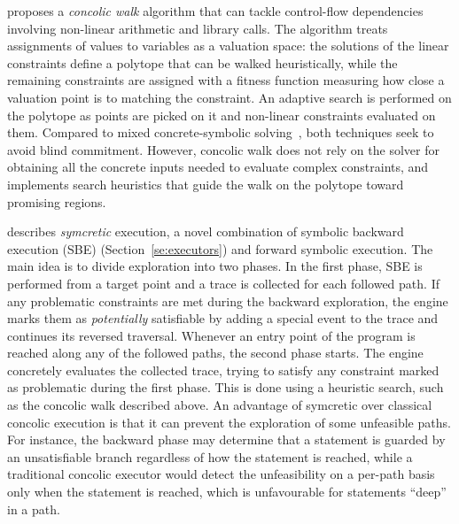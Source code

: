 \cite{DA-FSE14} proposes a {\em concolic walk} algorithm that can tackle control-flow dependencies involving non-linear arithmetic and library calls. The algorithm treats assignments of values to variables as a valuation space: the solutions of the linear constraints define a polytope that can be walked heuristically, while the remaining constraints are assigned with a fitness function measuring how close a valuation point is to matching the constraint. An adaptive search is performed on the polytope as points are picked on it and non-linear constraints evaluated on them. Compared to mixed concrete-symbolic solving~\cite{PRV-ISSTA11}, both techniques seek to avoid blind commitment. However, concolic walk does not rely on the solver for obtaining all the concrete inputs needed to evaluate complex constraints, and implements search heuristics that guide the walk on the polytope toward promising regions.


\cite{DA-ASE14} describes {\em symcretic} execution, a novel combination of symbolic backward execution (SBE) (Section~\ref{se:executors}) and forward symbolic execution. The main idea is to divide exploration into two phases. In the first phase, SBE is performed from a target point and a trace is collected for each followed path. If any problematic constraints are met during the backward exploration, the engine marks them as {\em potentially} satisfiable by adding a special event to the trace and continues its reversed traversal. Whenever an entry point of the program is reached along any of the followed paths, the second phase starts. The engine concretely evaluates the collected trace, trying to satisfy any constraint marked as problematic during the first phase. This is done using a heuristic search, such as the concolic walk described above. An advantage of symcretic over classical concolic execution is that it can prevent the exploration of some unfeasible paths. For instance, the backward phase may determine that a statement is guarded by an unsatisfiable branch regardless of how the statement is reached, while a traditional concolic executor would detect the unfeasibility on a per-path basis only when the statement is reached, which is unfavourable for statements ``deep'' in a path.

